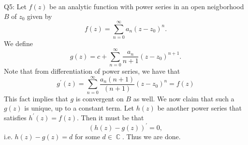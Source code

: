 \documentclass[letterpaper]{article}
\DeclareMathOperator{\C}{\mathbb{C}}
\begin{document}
\noindent Q5: Let $f(z)$ be an analytic function with power series in an open neigborhood $B$ of $z_0$ given by $$f(z) = \sum_{n=0}^\infty a_n (z-z_0)^n. $$
We define $$g(z) = c+ \sum_{n=0}^\infty \frac{a_n}{n+1} (z-z_0)^{n+1}. $$ Note that from differentiation of power series, we have that $$g^\prime (z) = \sum_{n=0}^\infty \frac{a_n(n+1)}{(n+1)}(z-z_0)^n = f(z)$$
This fact implies that $g$ is convergent on $B$ as well. We now claim that such a $g(z)$ is unique, up to a constant term. Let $h(z)$ be another power series that satisfies $h^\prime(z) =f(z)$. Then it must be that $$(h(z)-g(z))^\prime =0,$$ i.e. $h(z)-g(z) = d$ for some $d\in \C$. Thus we are done. 
\end{document}
